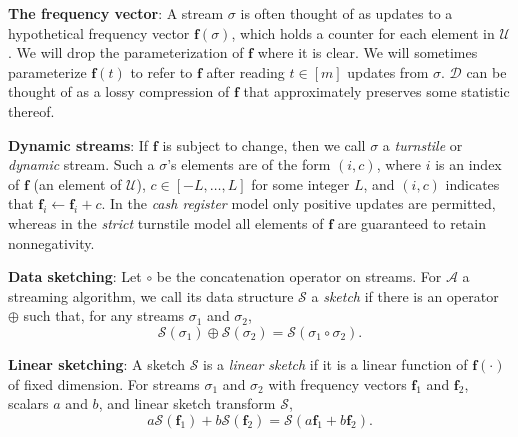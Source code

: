 \documentclass{report}
\begin{document}
\noindent
\textbf{The frequency vector}:
A stream $\sigma$ is often thought of as updates to a hypothetical frequency vector $\mathbf{f}(\sigma)$, which holds a counter for each element in $\mathcal{U}$.
We will drop the parameterization of $\mathbf{f}$ where it is clear.
We will sometimes parameterize $\mathbf{f}(t)$ to refer to $\mathbf{f}$ after reading $t \in [m]$ updates from $\sigma$.
$\mathcal{D}$ can be thought of as a lossy compression of $\mathbf{f}$ that approximately preserves some statistic thereof.

\noindent
\textbf{Dynamic streams}:
If $\mathbf{f}$ is subject to change, then we call $\sigma$ a \emph{turnstile} or \emph{dynamic} stream.
Such a $\sigma$'s elements are of the form $(i, c)$, where $i$ is an index of $\mathbf{f}$ (an element of $\mathcal{U}$), $c \in [-L, \dots, L]$ for some integer $L$, and $(i,c)$ indicates that $\mathbf{f}_i \gets \mathbf{f}_i + c$.
In the \emph{cash register} model only positive updates are permitted, whereas in the \emph{strict} turnstile model all elements of $\mathbf{f}$ are guaranteed to retain nonnegativity.

\noindent
\textbf{Data sketching}:
Let $\circ$ be the concatenation operator on streams.
For $\mathcal{A}$ a streaming algorithm, we call its data structure $\mathcal{S}$ a \emph{sketch} if there is an operator $\oplus$ such that, for any streams $\sigma_1$ and $\sigma_2$, 
%
\begin{equation} \label{eq:merge}
\mathcal{S}(\sigma_1) \oplus \mathcal{S}(\sigma_2) = \mathcal{S}(\sigma_1 \circ \sigma_2).
\end{equation}
%

\noindent
\textbf{Linear sketching}:
A sketch $\mathcal{S}$ is a \emph{linear sketch} if it is a linear function of $\mathbf{f}(\cdot)$ of fixed dimension.
%
For streams $\sigma_1$ and $\sigma_2$ with frequency vectors $\mathbf{f}_1$ and $\mathbf{f}_2$, scalars $a$ and $b$, and linear sketch transform $\mathcal{S}$, 
%
\begin{equation} \label{eq:linearity}
a\mathcal{S}(\mathbf{f}_1) + b\mathcal{S}(\mathbf{f}_2) = \mathcal{S}(a\mathbf{f}_1 + b\mathbf{f}_2).
\end{equation}
%
\end{document}
